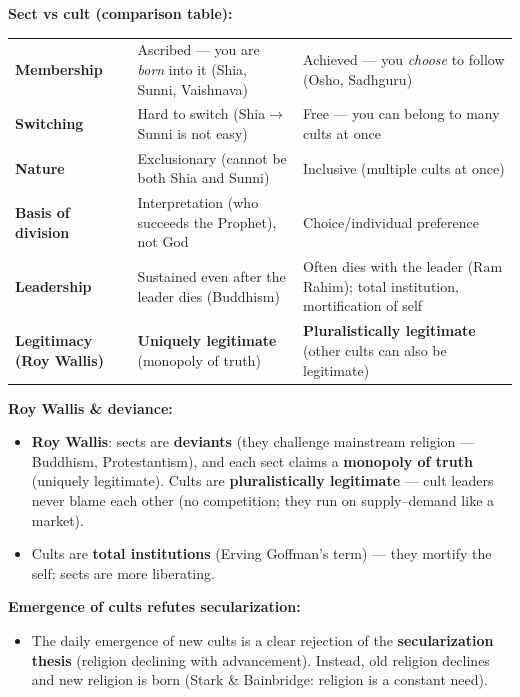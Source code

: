 \begin{DataFact}
\textbf{Sect vs cult (comparison table):}\vspace{4pt}
\begin{center}
\begin{tabularx}{\textwidth}{p{3.2cm} p{5cm} Y}
 &  &  \\
\midrule
\textbf{Membership} & Ascribed --- you are \textit{born} into it (Shia, Sunni, Vaishnava) & Achieved --- you \textit{choose} to follow (Osho, Sadhguru) \\
\textbf{Switching} & Hard to switch (Shia$\rightarrow$Sunni is not easy) & Free --- you can belong to many cults at once \\
\textbf{Nature} & Exclusionary (cannot be both Shia and Sunni) & Inclusive (multiple cults at once) \\
\textbf{Basis of division} & Interpretation (who succeeds the Prophet), not God & Choice/individual preference \\
\textbf{Leadership} & Sustained even after the leader dies (Buddhism) & Often dies with the leader (Ram Rahim); total institution, mortification of self \\
\textbf{Legitimacy (Roy Wallis)} & \textbf{Uniquely legitimate} (monopoly of truth) & \textbf{Pluralistically legitimate} (other cults can also be legitimate) \\
\bottomrule
\end{tabularx}
\end{center}
\end{DataFact}

\begin{CriticalPoint}
\textbf{Roy Wallis \& deviance:}
\begin{itemize}
\item \textbf{Roy Wallis}: sects are \textbf{deviants} (they challenge mainstream religion --- Buddhism, Protestantism), and each sect claims a \textbf{monopoly of truth} (uniquely legitimate). Cults are \textbf{pluralistically legitimate} --- cult leaders never blame each other (no competition; they run on supply--demand like a market).
\item Cults are \textbf{total institutions} (Erving Goffman's term) --- they mortify the self; sects are more liberating.
\end{itemize}
\end{CriticalPoint}

\begin{CriticalPoint}
\textbf{Emergence of cults refutes secularization:}
\begin{itemize}
\item The daily emergence of new cults is a clear rejection of the \textbf{secularization thesis} (religion declining with advancement). Instead, old religion declines and new religion is born (Stark \& Bainbridge: religion is a constant need).
\end{itemize}
\end{CriticalPoint}

